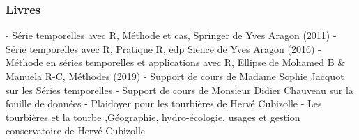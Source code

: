 \documentclass[a4paper,12pt]{report}%
\begin{document}
\subsubsection{Livres}  
- Série temporelles avec R, Méthode et cas, Springer de Yves Aragon (2011) \newline
- Série temporelles avec R, Pratique R, edp Sience de Yves Aragon (2016) \newline
- Méthode en séries temporelles et applications avec R, Ellipse de Mohamed B \& Manuela R-C, Méthodes (2019) \newline
- Support de cours de Madame Sophie Jacquot sur les  Séries temporelles \newline
- Support de cours de Monsieur Didier Chauveau sur la fouille de données \newline
- Plaidoyer pour les tourbières de Hervé Cubizolle \newline
- Les tourbières et la tourbe ,Géographie, hydro-écologie, usages et gestion conservatoire de Hervé Cubizolle \newline


\clearpage 
\end{document}

